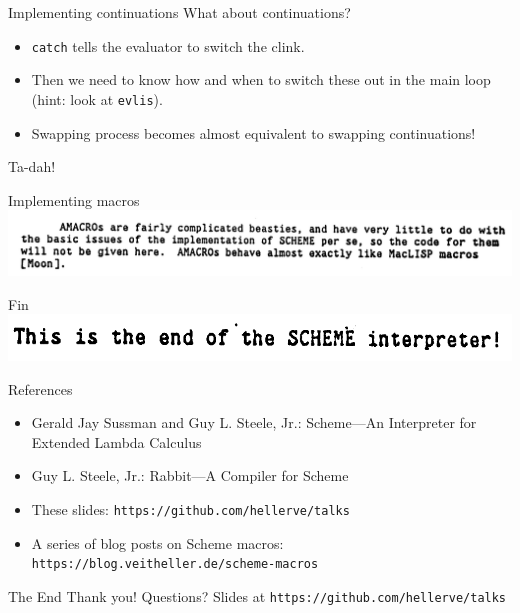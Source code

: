 \documentclass[aspectratio=169]{beamer}
\begin{document}
  \begin{frame}{Implementing continuations}
    What about continuations?

    \begin{itemize}
      \item \texttt{catch} tells the evaluator to switch the clink.
      \item Then we need to know how and when to switch these out in the main loop (hint: look at \texttt{evlis}).
      \item Swapping process becomes almost equivalent to swapping continuations!
    \end{itemize}

    Ta-dah!
  \end{frame}
  \begin{frame}{Implementing macros}
    \includegraphics[width=14cm]{beasties.png}
  \end{frame}
  \begin{frame}{Fin}
    \includegraphics[width=14cm]{interpreter_end.png}
  \end{frame}
  \begin{frame}{References}
    \begin{itemize}
      \item Gerald Jay Sussman and Guy L. Steele, Jr.: Scheme—An Interpreter for Extended Lambda Calculus
      \item Guy L. Steele, Jr.: Rabbit—A Compiler for Scheme
      \item These slides: \texttt{https://github.com/hellerve/talks}
      \item A series of blog posts on Scheme macros: \texttt{https://blog.veitheller.de/scheme-macros}
    \end{itemize}
  \end{frame}
  \begin{frame}{The End}
    \Huge Thank you!
    \linebreak
    \linebreak
    \linebreak
    \small Questions?
    \linebreak
    \linebreak
    \tiny Slides at \texttt{https://github.com/hellerve/talks}
  \end{frame}
\end{document}
